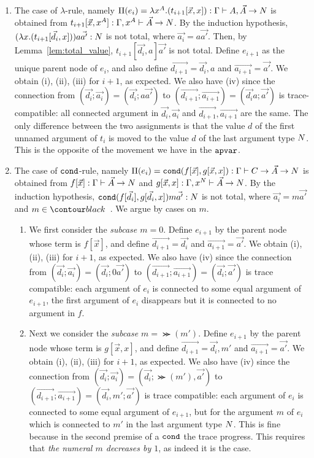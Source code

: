 \documentclass{article}
\newenvironment{proof}[1][Proof]{\begin{trivlist}
\item[\hskip \labelsep {\bfseries #1}]}{\end{trivlist}}
\begin{document}
\begin{proof}
\begin{enumerate}
\item
  The case of $\lambda$-rule, namely
  $\Pi(e_i) = \lambda x^A.(t_{i+1}[\vec{x},x]):
    \Gamma\vdash A, \vec{A} \rightarrow {N}$ is obtained from
  $t_{i+1}[\vec{x},x^A]:\Gamma,x^A\vdash \vec{A}\rightarrow{N}$.
  By the induction hypothesis, $(\lambda x.(t_{i+1}[\vec{d_i},x]))a\vec{a'}:{N}$ is not total,
  where $\vec{a_i} = a\vec{a'}$.
  Then, by Lemma~\ref{lem:total_value}, $t_{i+1}[\vec{d_i},a]\vec{a'}$ is not total. 
  Define $e_{i+1}$ as the unique parent node of $e_i$, and
  also define $\vec{d_{i+1}} = \vec{d_i},a$ and $\vec{a_{i+1}} = \vec{a'}$. 
  We obtain (i), (ii), (iii) for $i+1$, as expected.
  We also have (iv) since the connection from 
  $(\vec{d_i};\vec{a_i}) = (\vec{d_i};a\vec{a'})$ to $(\vec{d_{i+1}};\vec{a_{i+1}}) = (\vec{d_i}a;
    \vec{a'})$ is trace-compatible: all connected argument in $\vec{d_{i}},\vec{a_{i}}$ and 
  $\vec{d_{i+1}},\vec{a_{i+1}}$ are the same. The only difference between the two assignments
  is that the value $d$ of the first unnamed argument of $t_i$ is moved to the value $d$
  of the last argument type ${N}$.
  This is the opposite of the movement we have in the ${\tt apvar}$.

\item  
  The case of ${\tt cond}$-rule, namely
  $\Pi(e_i) = {\tt cond}(f[\vec{x}],g[\vec{x},x]):
    \Gamma\vdash C\rightarrow\vec{A}\rightarrow{N}$
  is obtained from 
  $f[\vec{x}]:\Gamma\vdash \vec{A}\rightarrow{N}$
  and
  $g[\vec{x},x]:\Gamma,x^{N}\vdash \vec{A}\rightarrow{N}$. 
  By the induction hypothesis, ${\tt cond}(f[\vec{d_i}],g[\vec{d_i},x])m\vec{a'}:{N}$ is not total,
  where $\vec{a_i} = m\vec{a'}$ and $m \in \Nat$. We argue by cases on $m$.
\begin{enumerate}
\item
  We first consider the \emph{subcase $m=0$}.
  Define $e_{i+1}$ by the parent node whose term is $f[\vec{x}]$,
  and define $\vec{d_{i+1}} = \vec{d_i}$ and $\vec{a_{i+1}} = \vec{a'}$. 
  We obtain (i), (ii), (iii) for $i+1$, as expected. 
  We also have (iv) since the connection from 
  $(\vec{d_i};\vec{a_i})
 =(\vec{d_i};0\vec{a'})$ to $(\vec{d_{i+1}};\vec{a_{i+1}}) = (\vec{d_i};\vec{a'})$
  is trace compatible: each argument of $e_i$ is connected to some equal argument of $e_{i+1}$,
  the first argument of $e_i$ disappears but it is connected to no argument in $f$.
\item
  Next we consider the \emph{subcase $m=\Succ(m')$}. 
  Define $e_{i+1}$ by the parent node whose term is $g[\vec{x},x]$,
  and define $\vec{d_{i+1}} = \vec{d_i},m'$ and $\vec{a_{i+1}} = \vec{a'}$. 
  We obtain (i), (ii), (iii) for $i+1$, as expected.
  We also have (iv) since the connection from 
  $(\vec{d_i};\vec{a_i})
  =(\vec{d_i};\Succ(m'),\vec{a'})$ to $(\vec{d_{i+1}};\vec{a_{i+1}}) = (\vec{d_i},m';\vec{a'})$
  is trace compatible: each argument of $e_i$ is connected to some equal argument of $e_{i+1}$,
  but for the argument $m$ of $e_i$ which is connected to $m'$ in the last argument type ${N}$.
  This is fine because in the second premise of a ${\tt cond}$ 
  the trace progress. This requires that \emph{the numeral $m$ decreases by $1$}, as indeed it is the case.
\end{enumerate}


\end{enumerate}
\end{proof}
\end{document}
